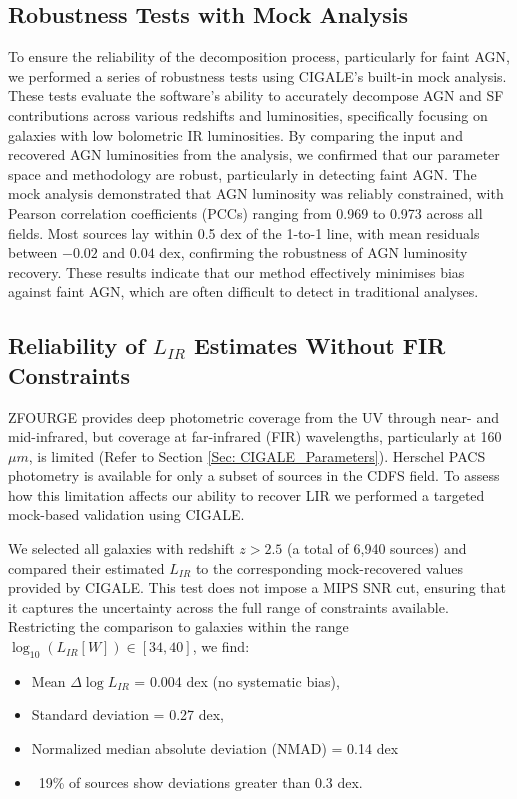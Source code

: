 \subsection{Robustness Tests with Mock Analysis} \label{Sec: Mock_Analysis}
To ensure the reliability of the decomposition process, particularly for faint AGN, we performed a series of robustness tests using CIGALE's built-in mock analysis. These tests evaluate the software's ability to accurately decompose AGN and SF contributions across various redshifts and luminosities, specifically focusing on galaxies with low bolometric IR luminosities. By comparing the input and recovered AGN luminosities from the analysis, we confirmed that our parameter space and methodology are robust, particularly in detecting faint AGN. The mock analysis demonstrated that AGN luminosity was reliably constrained, with Pearson correlation coefficients (PCCs) ranging from 0.969 to 0.973 across all fields. Most sources lay within 0.5 dex of the 1-to-1 line, with mean residuals between $-0.02$ and $0.04$ dex, confirming the robustness of AGN luminosity recovery. These results indicate that our method effectively minimises bias against faint AGN, which are often difficult to detect in traditional analyses.

\subsection{Reliability of $L_{IR}$ Estimates Without FIR Constraints} \label{Sec: FIR Constraints}
ZFOURGE provides deep photometric coverage from the UV through near- and mid-infrared, but coverage at far-infrared (FIR) wavelengths, particularly at 160$\mu m$, is limited (Refer to Section \ref{Sec: CIGALE_Parameters}). Herschel PACS photometry is available for only a subset of sources in the CDFS field. To assess how this limitation affects our ability to recover LIR we performed a targeted mock-based validation using CIGALE.

We selected all galaxies with redshift $z > 2.5$ (a total of 6,940 sources) and compared their estimated $L_{IR}$ to the corresponding mock-recovered values provided by CIGALE. This test does not impose a MIPS SNR cut, ensuring that it captures the uncertainty across the full range of constraints available. Restricting the comparison to galaxies within the range $\log_{10}(L_{IR} [W]) \in [34, 40]$, we find:

\begin{itemize}
    \item Mean $\Delta \log L_{IR}$ = 0.004 dex (no systematic bias),
    \item Standard deviation = 0.27 dex,
    \item Normalized median absolute deviation (NMAD) = 0.14 dex
    \item ~19\% of sources show deviations greater than 0.3 dex.
\end{itemize}

